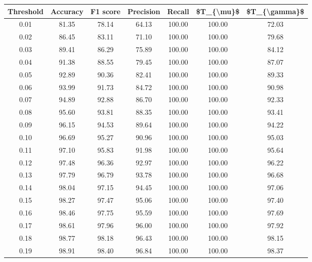 \begin{tabular}{|c|c|c|c|c|c|c|}
\hline
 Threshold &  Accuracy &  F1 score &  Precision &  Recall &  \$T\_\{\textbackslash mu\}\$ &  \$T\_\{\textbackslash gamma\}\$ \\
\hline
      0.01 &     81.35 &     78.14 &      64.13 &  100.00 &     100.00 &         72.03 \\
      0.02 &     86.45 &     83.11 &      71.10 &  100.00 &     100.00 &         79.68 \\
      0.03 &     89.41 &     86.29 &      75.89 &  100.00 &     100.00 &         84.12 \\
      0.04 &     91.38 &     88.55 &      79.45 &  100.00 &     100.00 &         87.07 \\
      0.05 &     92.89 &     90.36 &      82.41 &  100.00 &     100.00 &         89.33 \\
      0.06 &     93.99 &     91.73 &      84.72 &  100.00 &     100.00 &         90.98 \\
      0.07 &     94.89 &     92.88 &      86.70 &  100.00 &     100.00 &         92.33 \\
      0.08 &     95.60 &     93.81 &      88.35 &  100.00 &     100.00 &         93.41 \\
      0.09 &     96.15 &     94.53 &      89.64 &  100.00 &     100.00 &         94.22 \\
      0.10 &     96.69 &     95.27 &      90.96 &  100.00 &     100.00 &         95.03 \\
      0.11 &     97.10 &     95.83 &      91.98 &  100.00 &     100.00 &         95.64 \\
      0.12 &     97.48 &     96.36 &      92.97 &  100.00 &     100.00 &         96.22 \\
      0.13 &     97.79 &     96.79 &      93.78 &  100.00 &     100.00 &         96.68 \\
      0.14 &     98.04 &     97.15 &      94.45 &  100.00 &     100.00 &         97.06 \\
      0.15 &     98.27 &     97.47 &      95.06 &  100.00 &     100.00 &         97.40 \\
      0.16 &     98.46 &     97.75 &      95.59 &  100.00 &     100.00 &         97.69 \\
      0.17 &     98.61 &     97.96 &      96.00 &  100.00 &     100.00 &         97.92 \\
      0.18 &     98.77 &     98.18 &      96.43 &  100.00 &     100.00 &         98.15 \\
      0.19 &     98.91 &     98.40 &      96.84 &  100.00 &     100.00 &         98.37 \\

\end{tabular}
